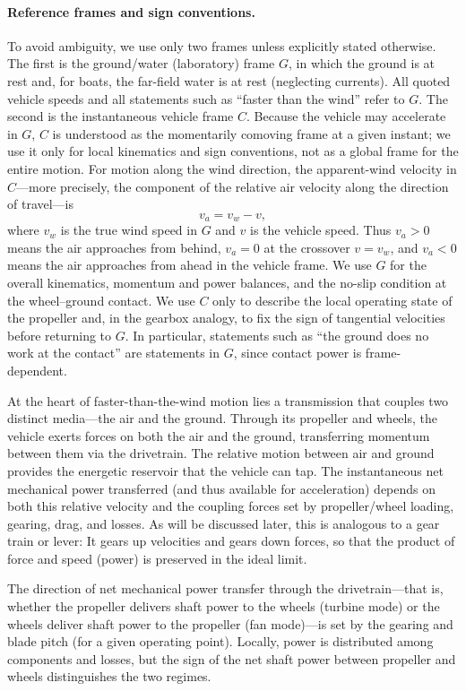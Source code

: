 \documentclass[reprint,aps,pra,longbibliography]{revtex4-2}
\begin{document}
\paragraph*{Reference frames and sign conventions.}
To avoid ambiguity, we use only two frames unless explicitly stated otherwise.
The first is the ground/water (laboratory) frame \(G\), in which the ground is
at rest and, for boats, the far-field water is at rest (neglecting currents).
All quoted vehicle speeds and all statements such as ``faster than the wind''
refer to \(G\). The second is the instantaneous vehicle frame \(C\). Because
the vehicle may accelerate in \(G\), \(C\) is understood as the momentarily
comoving frame at a given instant; we use it only for local kinematics and sign
conventions, not as a global frame for the entire motion. For motion along the
wind direction, the apparent-wind velocity in \(C\)---more precisely, the
component of the relative air velocity along the direction of travel---is
\[
v_a = v_w - v,
\]
where \(v_w\) is the true wind speed in \(G\) and \(v\) is the vehicle speed.
Thus \(v_a>0\) means the air approaches from behind, \(v_a=0\) at the crossover
\(v=v_w\), and \(v_a<0\) means the air approaches from ahead in the vehicle
frame. We use \(G\) for the overall kinematics, momentum and power balances,
and the no-slip condition at the wheel--ground contact. We use \(C\) only to
describe the local operating state of the propeller and, in the gearbox
analogy, to fix the sign of tangential velocities before returning to \(G\). In
particular, statements such as ``the ground does no work at the contact'' are
statements in \(G\), since contact power is frame-dependent.

At the heart of faster-than-the-wind motion lies a transmission that couples two distinct media---the air and the ground.
Through its propeller and wheels, the vehicle exerts forces on both the air
and the ground, transferring momentum between them via the drivetrain. The relative motion between air and ground provides the energetic reservoir that the vehicle can tap. The instantaneous net mechanical power transferred (and thus available for acceleration) depends on both this relative velocity and the coupling forces set by propeller/wheel loading, gearing, drag, and losses.
As will be discussed later, this is analogous to a gear train or lever: It gears up velocities and gears down forces, so that the product of force and speed (power) is preserved in the ideal limit.

The direction of net mechanical power transfer through the drivetrain---that is, whether the propeller delivers shaft power to the wheels (turbine mode) or the wheels deliver shaft power to the propeller (fan mode)---is set by the gearing and blade pitch (for a given operating point).
Locally, power is distributed among components and losses, but the sign of the net shaft power between propeller and wheels distinguishes the two regimes.
\end{document}
